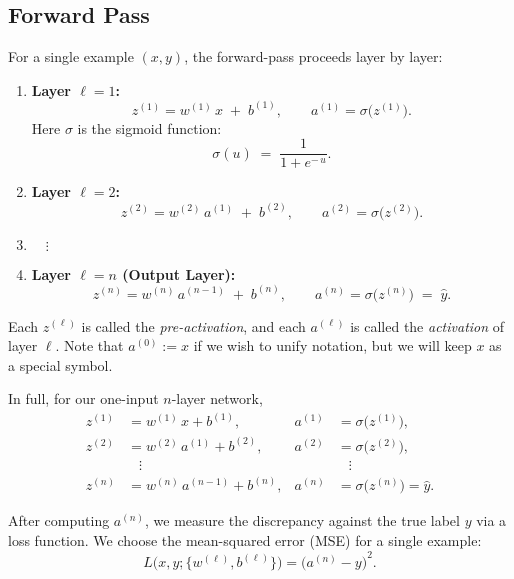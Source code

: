 \documentclass{article}
\begin{document}
\subsection{Forward Pass}\label{sec:nlayers-forward}

\noindent For a single example \((x,y)\), the forward-pass proceeds layer by layer:

\begin{enumerate}
    \item \textbf{Layer \(\ell = 1\):}  
    \[
      z^{(1)} = w^{(1)}\,x \;+\; b^{(1)}, 
      \qquad
      a^{(1)} = \sigma\bigl(z^{(1)}\bigr).
    \]
    \noindent Here \(\sigma\) is the sigmoid function:
    \[
      \sigma(u) \;=\; \frac{1}{1 + e^{-\,u}}.
    \]
    \item \textbf{Layer \(\ell = 2\):} 
    \[
      z^{(2)} = w^{(2)}\,a^{(1)} \;+\; b^{(2)}, 
      \qquad
      a^{(2)} = \sigma\bigl(z^{(2)}\bigr).
    \]
    \item \(\quad\vdots\)
    \item \textbf{Layer \(\ell = n\) (Output Layer):} 
    \[
      z^{(n)} = w^{(n)}\,a^{(n-1)} \;+\; b^{(n)}, 
      \qquad
      a^{(n)} = \sigma\bigl(z^{(n)}\bigr) \;=\; \hat{y}.
    \]
\end{enumerate}

\noindent Each \(z^{(\ell)}\) is called the \emph{pre-activation}, and each \(a^{(\ell)}\) is called the \emph{activation} of layer \(\ell\).  Note that \(a^{(0)} := x\) if we wish to unify notation, but we will keep \(x\) as a special symbol.

\vspace{0.5em}
\noindent In full, for our one-input \(n\)-layer network,
\[
\begin{aligned}
    z^{(1)} &= w^{(1)}\,x + b^{(1)}, & a^{(1)} &= \sigma\bigl(z^{(1)}\bigr),\\
    z^{(2)} &= w^{(2)}\,a^{(1)} + b^{(2)}, & a^{(2)} &= \sigma\bigl(z^{(2)}\bigr),\\
    &\;\;\;\vdots &&\;\;\;\vdots\\
    z^{(n)} &= w^{(n)}\,a^{(n-1)} + b^{(n)}, & a^{(n)} &= \sigma\bigl(z^{(n)}\bigr) = \hat{y}.
\end{aligned}
\]

\vspace{0.5em}
\noindent After computing \(a^{(n)}\), we measure the discrepancy against the true label \(y\) via a loss function.  We choose the mean-squared error (MSE) for a single example:
\[
    L\bigl(x,y; \{w^{(\ell)},b^{(\ell)}\}\bigr)
    = {\bigl(a^{(n)} - y\bigr)}^2.
\]
\end{document}
